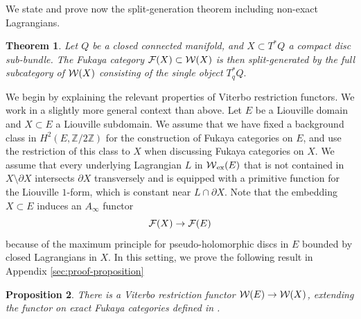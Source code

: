 \documentclass{article}
\DeclareMathOperator{\Mod}{mod}\DeclareMathOperator{\supp}{supp}\DeclareMathOperator{\obj}{obj}
\theoremstyle{plain}%
\newtheorem{thm}{Theorem}[section]
\newtheorem{prop}[thm]{Proposition}
\theoremstyle{definition}
\numberwithin{equation}{section}
\numberwithin{figure}{section}
\def\eq{\eqref}
\def\l{\label}
\def\cF{{\mathbin{\cal F}}}
\def\cW{{\mathbin{\cal W}}}
\def\Z{{\mathbin{\mathbb Z}}}
\def\-{\setminus}
\def\iy{\infty}
\def\ex{{   {\rm ex}    }}\def\virt{{   {\rm virt}    }}\def\ev{{\rm ev}}\def\sing{{\rm sing}}\def\cont{{\rm cont}}
\begin{document}
We state and prove now the split-generation theorem including non-exact Lagrangians.
\begin{thm}\l{thm: gen}
Let $Q$ be a closed connected manifold, and $X\subset T^*Q$ a compact disc sub-bundle. The Fukaya category $\cF(X)\subset \cW(X)$ is then split-generated by the full subcategory of $\cW(X)$ consisting of the single object $T_q^*Q.$
\end{thm}

We begin by explaining the relevant properties of Viterbo restriction functors. We work in a slightly more general context than above. Let $E$ be a Liouville domain and $X\subset E$ a Liouville subdomain.  We assume that we have fixed a background class in $H^2(E,\Z/2\Z)$ for the construction of Fukaya categories on $E$, and use the restriction of this class to $X$ when discussing Fukaya categories on $X.$ We assume that every underlying Lagrangian $L$ in $\cW_\ex(E)$ that is not contained in $X\-\partial X$ intersects $\partial X$ transversely and is equipped with a primitive function for the Liouville $1$-form, which is constant near $L\cap \partial X$. Note that the embedding $X\subset E$ induces an $A_\iy$ functor
\begin{equation}\l{XE}
    \cF(X)\to\cF(E)
\end{equation}
because of the maximum principle for pseudo-holomorphic discs in $E$ bounded by closed Lagrangians in $X.$ In this setting, we prove the following result in Appendix \ref{sec:proof-proposition}
\begin{prop}\l{prop: restriction compatible}
There is a Viterbo restriction functor $\cW(E) \to \cW(X)$, extending the functor on exact Fukaya categories defined in \cite{AS}.  %
\end{prop}
\end{document}
